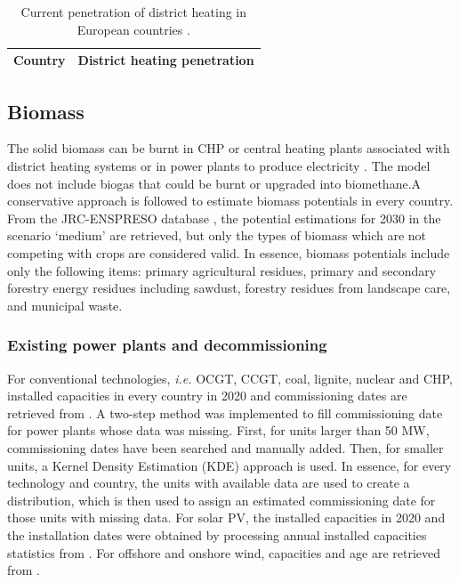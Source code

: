 \documentclass[3p]{elsarticle} %
\begin{document}
\begin{table}[!b]
\footnotesize
\centering
\begin{threeparttable}
\caption{Current penetration of district heating in European countries \cite{DH_penetration}.} \label{tab_DH_penetration}
\centering
\begin{tabularx}{5.5cm}{lc}
\toprule
Country & District heating penetration  \\
\midrule

\bottomrule
\end{tabularx}
\end{threeparttable}
\end{table}


\subsection{Biomass}
The solid biomass can be burnt in CHP or central heating plants associated with district heating systems or in power plants to produce electricity . The model does not include biogas that could be burnt or upgraded into biomethane.A conservative approach is followed to estimate biomass potentials in every country. From the JRC-ENSPRESO database \cite{JRC_biomass, ENSPRESO}, the potential estimations for 2030 in the scenario `medium' are retrieved, but only the types of biomass which are not competing with crops are considered valid. In essence, biomass potentials include only the following items: primary agricultural residues, primary and secondary forestry energy residues including sawdust, forestry residues from landscape care, and municipal waste.

\subsubsection{Existing power plants and decommissioning}

For conventional technologies, \textit{i.e.} OCGT, CCGT, coal, lignite, nuclear and CHP, installed capacities in every country in 2020 and commissioning dates are retrieved from \cite{powerplantmatching}. 
A two-step method was implemented to fill commissioning date for power plants whose data was missing. First, for units larger than 50 MW, commissioning dates have been searched and manually added. Then, for smaller units, a Kernel Density Estimation (KDE) approach is used. In essence, for every technology and country, the units with available data are used to create a distribution, which is then used to assign an estimated commissioning date for those units with missing data. For solar PV, the installed capacities in 2020 and the installation dates were obtained by processing annual installed capacities statistics from \cite{IRENA_2019}. For offshore and onshore wind, capacities and age are retrieved from \cite{thewindpower}.
\end{document}
